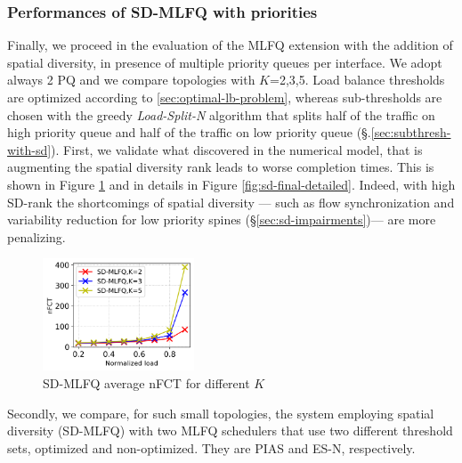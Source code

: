 \subsubsection{Performances of SD-MLFQ with priorities}
Finally, we proceed in the evaluation of the MLFQ extension with the addition of spatial diversity, in presence of multiple priority queues per interface. We adopt always 2 PQ and we compare topologies with $K$=2,3,5. Load balance thresholds are optimized according to \ref{sec:optimal-lb-problem}, whereas sub-thresholds are chosen with the greedy \textit{Load-Split-N} algorithm that splits half of the traffic on high priority queue and half of the traffic on low priority queue (\S.\ref{sec:subthresh-with-sd}). First, we validate what discovered in the numerical model, that is augmenting the spatial diversity rank leads to worse completion times. This is shown in Figure \ref{fig:sdmlfq_varying_K} and in details in Figure \ref{fig:sd-final-detailed}. Indeed, with high SD-rank the shortcomings of spatial diversity --- such as flow synchronization and variability reduction for low priority spines (\S \ref{sec:sd-impairments})--- are more penalizing. \\
\begin{figure}[!tb]
	\centering
	\includegraphics[width=0.4\textwidth]{Chapter4/Figures/sd-larger-topology}
	\caption{SD-MLFQ average nFCT for different $K$}
	\label{fig:sdmlfq_varying_K}
\end{figure}%
Secondly, we compare, for such small topologies, the system employing spatial diversity (SD-MLFQ) with two MLFQ schedulers that use two different threshold sets, optimized and non-optimized. They are PIAS and ES-N, respectively.
